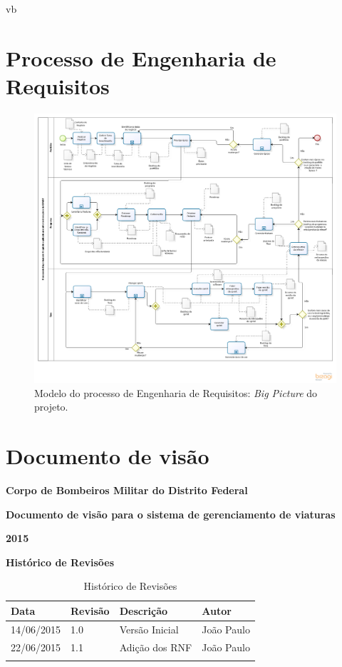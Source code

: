 vb\begin{apendicesenv}
  
  \chapter{Processo de Engenharia de Requisitos}
  
    \begin{figure}[!htbp]
      \centering
      \includegraphics[scale=0.46, angle = 90]{figuras/project_big_picture}
      \caption[Modelo do processo de Engenharia de Requisitos]
	  {Modelo do processo de Engenharia de Requisitos: \textit{Big Picture} do projeto.}
      \label{project_big_picture}
    \end{figure}
  
  \chapter{Documento de visão}
	{\centering
	\textbf{Corpo de Bombeiros Militar do Distrito Federal}

	\textbf{Documento de visão para o sistema de gerenciamento de viaturas}

	\textbf{2015}

	}
	\textbf{Histórico de Revisões}
	\begin{table}[h]
	\centering
	\label{my-label}
	\begin{tabular}{|l|l|l|l|}
	\hline
	Data & Revisão & Descrição & Autor \\ \hline
	14/06/2015 & 1.0 & Versão Inicial & João Paulo \\ \hline
	22/06/2015 & 1.1 & Adição dos RNF & João Paulo \\ \hline
	     &         &           &       \\ \hline
	\end{tabular}
	\caption{Histórico de Revisões}
	\end{table}
  

\end{apendicesenv}
